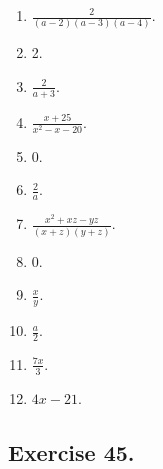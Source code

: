 \documentclass{book}
\begin{document}
\begin{enumerate}
\item $\displaystyle \frac{2}{(a - 2)(a - 3)(a - 4)}$.

\item 2.

\item $\displaystyle \frac{2}{a + 3}$.

\item $\displaystyle \frac{x + 25}{x^{2} - x - 20}$.

\item 0.

\item $\displaystyle \frac{2}{a}$.

\item $\displaystyle \frac{x^{2} + x z - y z}{(x + z)(y + z)}$.

\item 0.

\item $\displaystyle \frac{x}{y}$.

\item $\displaystyle \frac{a}{2}$.

\item $\displaystyle \frac{7 x}{3}$.

\item $4 x - 21$.

\end{enumerate}


\subsection*{Exercise 45.}
\end{document}
